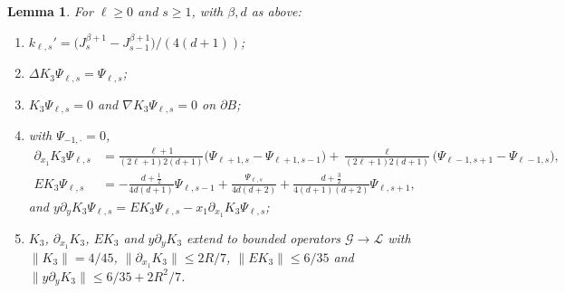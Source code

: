\documentclass[11pt]{amsart}
\newtheorem{lemma}[theorem]{Lemma}
\theoremstyle{definition}
\theoremstyle{remark}
\numberwithin{equation}{section}
\newcommand{\Gc}{\mathcal{G}}
\newcommand{\nrm}[1]{\lVert #1\rVert}
\begin{document}
\begin{lemma}\label{r3:lem-K}
For $\ell\geq0$ and $s\geq1$, with $\beta,d$ as above:
\begin{enumerate}[label=\textup{(\alph*)}]
\item $k_{\ell,s}'=\big(J^{\beta+1}_s-J^{\beta+1}_{s-1}\big)/(4(d+1))$;
\item $\Delta K_3\Psi_{\ell,s}=\Psi_{\ell,s}$;
\item $K_3\Psi_{\ell,s}=0$ and $\nabla K_3\Psi_{\ell,s}=0$ on $\partial B$;
\item with $\Psi_{-1,\cdot}=0$,
\begin{align*}
\partial_{x_1}K_3\Psi_{\ell,s}&=\frac{\ell+1}{(2\ell+1)2(d+1)}\big(\Psi_{\ell+1,s}-\Psi_{\ell+1,s-1}\big)+\frac{\ell}{(2\ell+1)2(d+1)}\big(\Psi_{\ell-1,s+1}-\Psi_{\ell-1,s}\big),\\
EK_3\Psi_{\ell,s}&=-\frac{d+\frac12}{4d(d+1)}\Psi_{\ell,s-1}+\frac{\Psi_{\ell,s}}{4d(d+2)}+\frac{d+\frac32}{4(d+1)(d+2)}\Psi_{\ell,s+1},
\end{align*}
and $y\partial_yK_3\Psi_{\ell,s}=EK_3\Psi_{\ell,s}-x_1\partial_{x_1}K_3\Psi_{\ell,s}$;
\item $K_3$, $\partial_{x_1}K_3$, $EK_3$ and $y\partial_yK_3$ extend to bounded operators $\Gc\to\mathcal L$ with $\nrm{K_3}=4/45$, $\nrm{\partial_{x_1}K_3}\leq2R/7$, $\nrm{EK_3}\leq6/35$ and $\nrm{y\partial_yK_3}\leq6/35+2R^2/7$.
\end{enumerate}
\end{lemma}
\end{document}
